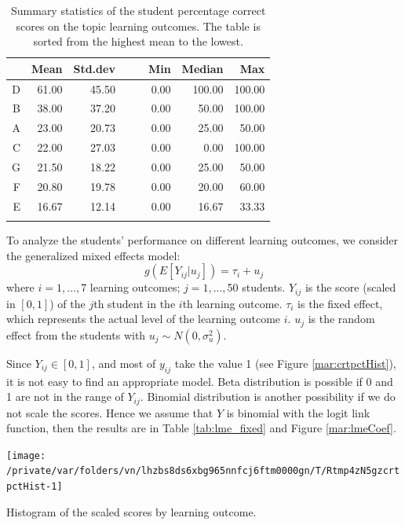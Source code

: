 \documentclass[12pt,english,nohyper]{tufte-handout}\usepackage[]{graphicx}\usepackage[]{color}
\newenvironment{knitrout}{}{} %
\begin{document}
\begin{longtable}{rrrllrrr}
  \hline
 & Mean & Std.dev &   &   & Min & Median & Max \\ 
  \hline
D & 61.00 & 45.50 &  &  & 0.00 & 100.00 & 100.00 \\ 
  B & 38.00 & 37.20 &  &  & 0.00 & 50.00 & 100.00 \\ 
  A & 23.00 & 20.73 &  &  & 0.00 & 25.00 & 50.00 \\ 
  C & 22.00 & 27.03 &  &  & 0.00 & 0.00 & 100.00 \\ 
  G & 21.50 & 18.22 &  &  & 0.00 & 25.00 & 50.00 \\ 
  F & 20.80 & 19.78 &  &  & 0.00 & 20.00 & 60.00 \\ 
  E & 16.67 & 12.14 &  &  & 0.00 & 16.67 & 33.33 \\ 
   \hline
\hline
\caption{Summary statistics of the student percentage correct scores on the topic learning outcomes. The table is sorted from the highest mean to the lowest.} 
\label{tab:LearningObj_summary}
\end{longtable}






To analyze the students' performance on different learning outcomes, we consider the generalized mixed effects model:
\[
g(E[Y_{ij}|u_{j}])= \tau_{i}+u_{j}
\]
where $i=1,...,$7 learning outcomes;
$j=1,...,$50 students. $Y_{ij}$ is the score (scaled in $[0,1]$) of
the $j$th student in the $i$th learning outcome. $\tau_i$ is the fixed effect,
which represents the actual level of the learning outcome $i$.
$u_j$ is the random effect from the students with
$u_{j} \sim N(0,\sigma_{u}^{2})$.

Since $Y_{ij} \in [0,1]$, and most of $y_{ij}$ take the value 1
(see Figure \ref{mar:crtpctHist}), it is not easy to find an appropriate model.
Beta distribution is possible if 0 and 1 are not in the range of $Y_{ij}$.
Binomial distribution is another possibility if we do not scale the scores.
Hence we assume that $Y$ is binomial with the logit link function,
then the results are in Table \ref{tab:lme_fixed} and Figure \ref{mar:lmeCoef}.

\begin{knitrout}
\color{fgcolor}\begin{marginfigure}
\texttt{[image: /private/var/folders/vn/lhzbs8ds6xbg965nnfcj6ftm0000gn/T/Rtmp4zN5gzcrtpctHist-1]} \caption[Histogram of the scaled scores by learning outcome]{Histogram of the scaled scores by learning outcome.}\label{mar:crtpctHist}
\end{marginfigure}


\end{knitrout}
\end{document}
